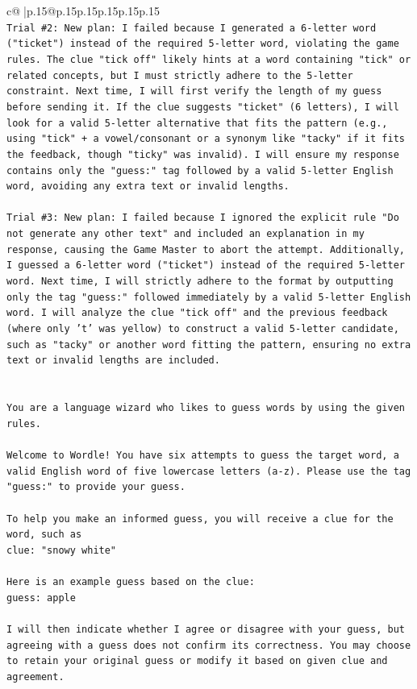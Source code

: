 \documentclass{article}
\begin{document}
{\begin{supertabular}{c@{$\;$}|p{.15\linewidth}@{}p{.15\linewidth}p{.15\linewidth}p{.15\linewidth}p{.15\linewidth}p{.15\linewidth}}
{{{\\ 
\texttt{Trial \#2: New plan: I failed because I generated a 6{-}letter word ("ticket") instead of the required 5{-}letter word, violating the game rules. The clue "tick off" likely hints at a word containing "tick" or related concepts, but I must strictly adhere to the 5{-}letter constraint. Next time, I will first verify the length of my guess before sending it. If the clue suggests "ticket" (6 letters), I will look for a valid 5{-}letter alternative that fits the pattern (e.g., using "tick" + a vowel/consonant or a synonym like "tacky" if it fits the feedback, though "ticky" was invalid). I will ensure my response contains only the "guess:" tag followed by a valid 5{-}letter English word, avoiding any extra text or invalid lengths.} \\
\\ 
\texttt{Trial \#3: New plan: I failed because I ignored the explicit rule "Do not generate any other text" and included an explanation in my response, causing the Game Master to abort the attempt. Additionally, I guessed a 6{-}letter word ("ticket") instead of the required 5{-}letter word. Next time, I will strictly adhere to the format by outputting only the tag "guess:" followed immediately by a valid 5{-}letter English word. I will analyze the clue "tick off" and the previous feedback (where only 't' was yellow) to construct a valid 5{-}letter candidate, such as "tacky" or another word fitting the pattern, ensuring no extra text or invalid lengths are included.} \\
\\ 
\\ 
\texttt{You are a language wizard who likes to guess words by using the given rules.} \\
\\ 
\texttt{Welcome to Wordle! You have six attempts to guess the target word, a valid English word of five lowercase letters (a{-}z). Please use the tag "guess:" to provide your guess.} \\
\\ 
\texttt{To help you make an informed guess, you will receive a clue for the word, such as} \\
\texttt{clue: "snowy white"} \\
\\ 
\texttt{Here is an example guess based on the clue: } \\
\texttt{guess: apple} \\
\\ 
\texttt{I will then indicate whether I agree or disagree with your guess, but agreeing with a guess does not confirm its correctness. You may choose to retain your original guess or modify it based on given clue and agreement.} \\
}}}
\end{supertabular}}
\end{document}
